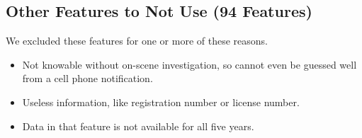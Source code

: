 \subsection{Other Features to Not Use (94 Features)}

We excluded these features for one or more of these reasons.  

\begin{itemize}
	\item Not knowable without on-scene investigation, so cannot even be guessed well from a cell phone notification.
	\item Useless information, like registration number or license number.
	\item Data in that feature is not available for all five years.
\end{itemize}


